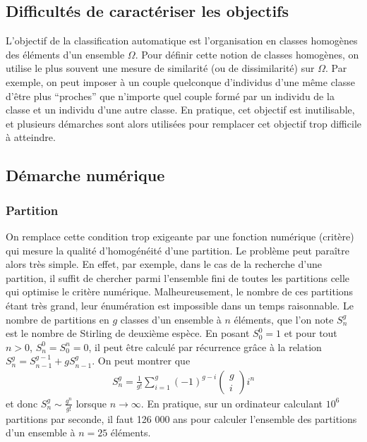 \documentclass[letterpaper,10pt,english]{jupyterBook}
\begin{document}
\subsection{Difficultés de caractériser les objectifs}
\label{\detokenize{clustering:difficultes-de-caracteriser-les-objectifs}}
\sphinxAtStartPar
L’objectif de la classification automatique est l’organisation en classes homogènes des éléments d’un ensemble  \(\Omega\). Pour définir cette notion de classes homogènes, on utilise le plus souvent une mesure de similarité (ou de dissimilarité) sur  \(\Omega\). Par exemple, on peut imposer à un couple quelconque d’individus d’une même classe d’être plus “proches” que n’importe quel couple formé par un individu de la classe et un individu d’une autre classe. En pratique, cet objectif est inutilisable, et plusieurs démarches sont alors utilisées pour remplacer cet objectif trop difficile à atteindre.


\subsection{Démarche numérique}
\label{\detokenize{clustering:demarche-numerique}}

\subsubsection{Partition}
\label{\detokenize{clustering:id1}}
\sphinxAtStartPar
On remplace cette condition trop exigeante par une fonction numérique (critère) qui mesure la qualité d’homogénéité d’une partition. Le problème peut paraître alors très simple. En effet, par exemple, dans le cas de la recherche d’une partition, il suffit de chercher parmi l’ensemble fini de toutes les partitions celle qui optimise le critère numérique. Malheureusement, le nombre de ces partitions étant très grand, leur énumération est impossible dans un temps raisonnable.
Le nombre de partitions en \(g\) classes d’un ensemble à \(n\) éléments, que l’on note \(S_n^g\) est le nombre de Stirling de deuxième espèce. En posant \(S_0^0=1\) et pour tout \(n>0\), \(S_n^0=S_0^n=0\), il peut être calculé par récurrence grâce à la relation \(S_n^g=S_{n-1}^{g-1}+gS_{n-1}^g\). On peut montrer que
\begin{equation*}
\begin{split}S_n^g = \frac{1}{g!}\displaystyle\sum_{i=1}^g (-1)^{g-i}\begin{pmatrix}g\\ i \end{pmatrix}i^n\end{split}
\end{equation*}
\sphinxAtStartPar
et donc \(S_n^g\sim \frac{g^n}{g!}\) lorsque \(n\rightarrow\infty\). En pratique, sur un ordinateur calculant \(10^6\) partitions par seconde, il faut 126 000 ans pour calculer l’ensemble des partitions d’un ensemble à \(n=25\) éléments.
\end{document}
